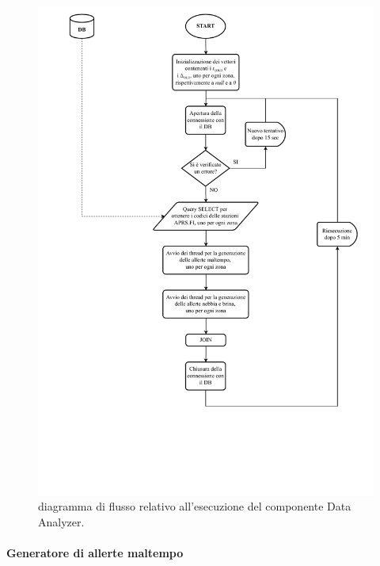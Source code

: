 \begin{figure}[h!]
	\centering
	\includegraphics[width=1\linewidth]{./Iterazione 3/OtherFiles/FC - Data analyzer}
	\caption{diagramma di flusso relativo all'esecuzione del componente Data Analyzer.}
	\label{fig:DAFlowChart}
\end{figure}

\paragraph{Generatore di allerte maltempo} 

